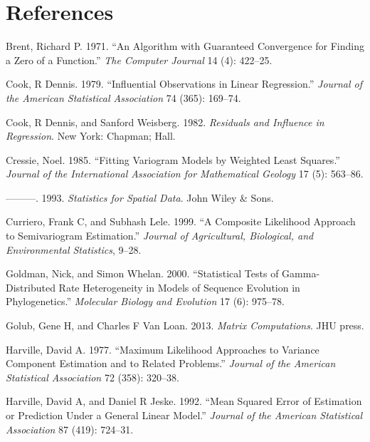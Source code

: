 \documentclass{article}
\newlength{\cslhangindent}
\newlength{\cslentryspacingunit} %
\newenvironment{CSLReferences}[2] %
 {%
  \setlength{\parindent}{0pt}
  \ifodd #1
  \let\oldpar\par
  \def\par{\hangindent=\cslhangindent\oldpar}
  \fi
  \setlength{\parskip}{#2\cslentryspacingunit}
 }%
 {}
\begin{document}
\hypertarget{references}{%
\section*{References}\label{references}}

\hypertarget{refs}{}
\begin{CSLReferences}{1}{0}
\leavevmode\hypertarget{ref-brent1971algorithm}{}%
Brent, Richard P. 1971. {``An Algorithm with Guaranteed Convergence for
Finding a Zero of a Function.''} \emph{The Computer Journal} 14 (4):
422--25.

\leavevmode\hypertarget{ref-cook1979influential}{}%
Cook, R Dennis. 1979. {``Influential Observations in Linear
Regression.''} \emph{Journal of the American Statistical Association} 74
(365): 169--74.

\leavevmode\hypertarget{ref-cook1982residuals}{}%
Cook, R Dennis, and Sanford Weisberg. 1982. \emph{Residuals and
Influence in Regression}. New York: Chapman; Hall.

\leavevmode\hypertarget{ref-cressie1985fitting}{}%
Cressie, Noel. 1985. {``Fitting Variogram Models by Weighted Least
Squares.''} \emph{Journal of the International Association for
Mathematical Geology} 17 (5): 563--86.

\leavevmode\hypertarget{ref-cressie1993statistics}{}%
---------. 1993. \emph{Statistics for Spatial Data}. John Wiley \& Sons.

\leavevmode\hypertarget{ref-curriero1999composite}{}%
Curriero, Frank C, and Subhash Lele. 1999. {``A Composite Likelihood
Approach to Semivariogram Estimation.''} \emph{Journal of Agricultural,
Biological, and Environmental Statistics}, 9--28.

\leavevmode\hypertarget{ref-goldman2000statistical}{}%
Goldman, Nick, and Simon Whelan. 2000. {``Statistical Tests of
Gamma-Distributed Rate Heterogeneity in Models of Sequence Evolution in
Phylogenetics.''} \emph{Molecular Biology and Evolution} 17 (6):
975--78.

\leavevmode\hypertarget{ref-golub2013matrix}{}%
Golub, Gene H, and Charles F Van Loan. 2013. \emph{Matrix Computations}.
JHU press.

\leavevmode\hypertarget{ref-harville1977maximum}{}%
Harville, David A. 1977. {``Maximum Likelihood Approaches to Variance
Component Estimation and to Related Problems.''} \emph{Journal of the
American Statistical Association} 72 (358): 320--38.

\leavevmode\hypertarget{ref-harville1992mean}{}%
Harville, David A, and Daniel R Jeske. 1992. {``Mean Squared Error of
Estimation or Prediction Under a General Linear Model.''} \emph{Journal
of the American Statistical Association} 87 (419): 724--31.


\end{CSLReferences}
\end{document}
